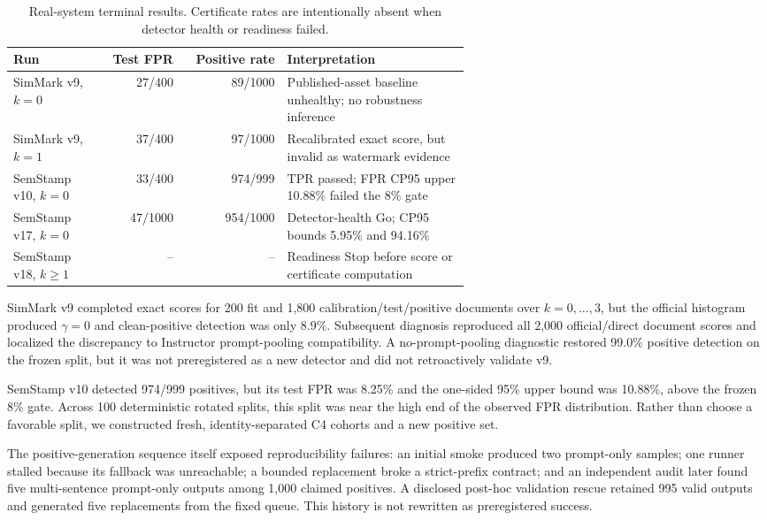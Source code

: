 \documentclass[10pt]{article}
\begin{document}
\begin{table}[t]
\caption{Real-system terminal results. Certificate rates are intentionally
absent when detector health or readiness failed.}
\label{tab:systems}
\centering
\small
\begin{tabular}{p{0.20\linewidth}rrp{0.40\linewidth}}
\toprule
Run & Test FPR & Positive rate & Interpretation \\
\midrule
SimMark v9, $k=0$ & 27/400 & 89/1000 &
Published-asset baseline unhealthy; no robustness inference \\
SimMark v9, $k=1$ & 37/400 & 97/1000 &
Recalibrated exact score, but invalid as watermark evidence \\
SemStamp v10, $k=0$ & 33/400 & 974/999 &
TPR passed; FPR CP95 upper 10.88\% failed the 8\% gate \\
SemStamp v17, $k=0$ & 47/1000 & 954/1000 &
Detector-health Go; CP95 bounds 5.95\% and 94.16\% \\
SemStamp v18, $k\geq1$ & -- & -- &
Readiness Stop before score or certificate computation \\
\bottomrule
\end{tabular}
\end{table}

SimMark v9 completed exact scores for 200 fit and 1,800
calibration/test/positive documents over $k=0,\ldots,3$, but the official
histogram produced $\gamma=0$ and clean-positive detection was only 8.9\%.
Subsequent diagnosis reproduced all 2,000 official/direct document scores and
localized the discrepancy to Instructor prompt-pooling compatibility. A
no-prompt-pooling diagnostic restored 99.0\% positive detection on the frozen
split, but it was not preregistered as a new detector and did not retroactively
validate v9.

SemStamp v10 detected 974/999 positives, but its test FPR was 8.25\% and the
one-sided 95\% upper bound was 10.88\%, above the frozen 8\% gate.
Across 100 deterministic rotated splits, this split was near the high end of
the observed FPR distribution. Rather than choose a favorable split, we
constructed fresh, identity-separated C4 cohorts and a new positive set.

The positive-generation sequence itself exposed reproducibility failures:
an initial smoke produced two prompt-only samples; one runner stalled because
its fallback was unreachable; a bounded replacement broke a strict-prefix
contract; and an independent audit later found five multi-sentence
prompt-only outputs among 1,000 claimed positives. A disclosed post-hoc
validation rescue retained 995 valid outputs and generated five replacements
from the fixed queue. This history is not rewritten as preregistered success.
\end{document}
